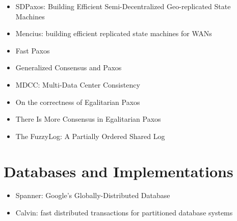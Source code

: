 \documentclass{article}
\begin{document}
\begin{itemize}
	\item{SDPaxos: Building Efficient Semi-Decentralized Geo-replicated State Machines \cite{zhao2018sdpaxos}}

	\item{Mencius: building efficient replicated state machines for WANs \cite{Mencius}}

	\item{Fast Paxos \cite{lamport2006fast}}

	\item{Generalized Consensus and Paxos \cite{lamport2005generalized}}

	\item{MDCC: Multi-Data Center Consistency \cite{MDCC}}

	\item{On the correctness of Egalitarian Paxos \cite{SutraEPaxos}}

	\item{There Is More Consensus in Egalitarian Paxos \cite{EPaxos}}

	\item{The FuzzyLog: A Partially Ordered Shared Log \cite{FuzzyLog}}
\end{itemize}

\section{Databases and Implementations}

\begin{itemize}
	\item{Spanner: Google's Globally-Distributed Database \cite{Spanner}}

	\item{Calvin: fast distributed transactions for partitioned database systems \cite{Calvin}}
\end{itemize}



\end{document}
